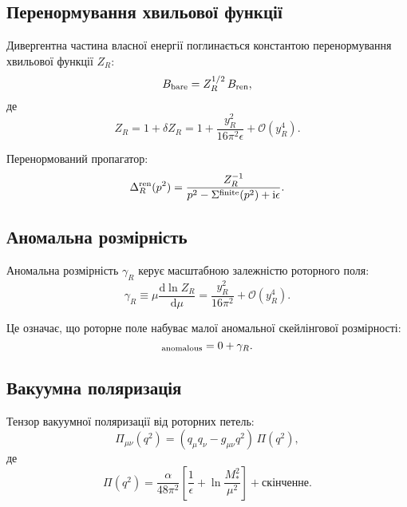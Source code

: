 \documentclass[11pt,a4paper]{article}
\numberwithin{equation}{section}
\theoremstyle{plain}
\theoremstyle{definition}
\theoremstyle{remark}
\newcommand{\dd}{\mathrm{d}}
\newcommand{\ii}{\mathrm{i}}
\newcommand{\Rfield}{R(x)}                  %
\begin{document}
\subsection{Перенормування хвильової функції}

Дивергентна частина власної енергії поглинається константою перенормування хвильової функції $Z_R$:
\begin{equation}
B_{\rm bare} = Z_R^{1/2}\,B_{\rm ren},
\label{eq:Z-R}
\end{equation}
де
\begin{equation}
Z_R = 1 + \delta Z_R = 1 + \frac{y_R^2}{16\pi^2\epsilon} + \mathcal{O}(y_R^4).
\label{eq:delta-Z-R}
\end{equation}

Перенормований пропагатор:
\begin{equation}
\Delta_R^{\rm ren}(p^2) = \frac{Z_R^{-1}}{p^2 - \Sigma^{\rm finite}(p^2) + \ii\epsilon}.
\label{eq:prop-ren}
\end{equation}

\subsection{Аномальна розмірність}

Аномальна розмірність $\gamma_R$ керує масштабною залежністю роторного поля:
\begin{equation}
\gamma_R \equiv \mu\frac{\dd\ln Z_R}{\dd\mu} = \frac{y_R^2}{16\pi^2} + \mathcal{O}(y_R^4).
\label{eq:gamma-R}
\end{equation}

Це означає, що роторне поле набуває малої аномальної скейлінгової розмірності:
\begin{equation}
[\Rfield]_{\rm anomalous} = 0 + \gamma_R.
\label{eq:dim-anomalous}
\end{equation}

\subsection{Вакуумна поляризація}

Тензор вакуумної поляризації від роторних петель:
\begin{equation}
\Pi_{\mu\nu}(q^2) = (q_\mu q_\nu - g_{\mu\nu}q^2)\,\Pi(q^2),
\label{eq:vacuum-pol}
\end{equation}
де
\begin{equation}
\Pi(q^2) = \frac{\alpha}{48\pi^2}\left[\frac{1}{\epsilon} + \ln\frac{M_*^2}{\mu^2}\right] + \text{скінченне}.
\label{eq:Pi}
\end{equation}
\end{document}
